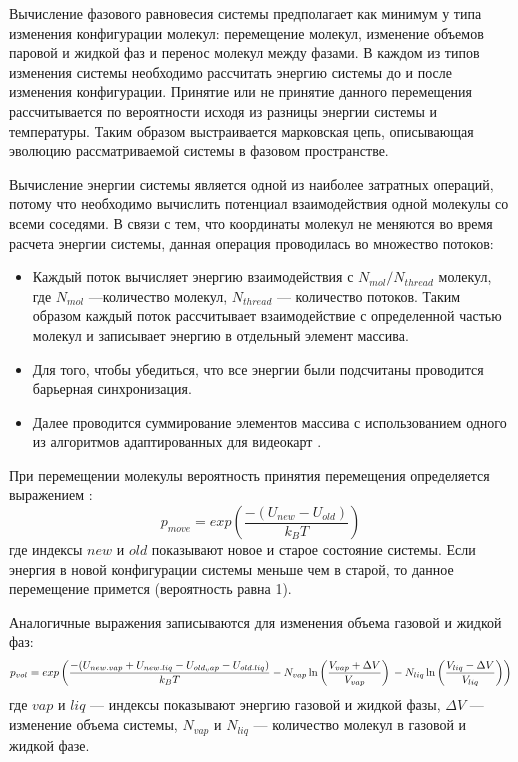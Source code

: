 Вычисление фазового равновесия системы предполагает как минимум у типа изменения конфигурации молекул: перемещение молекул, изменение объемов паровой и жидкой фаз и перенос молекул между фазами. В каждом из типов изменения системы необходимо рассчитать  энергию системы до и после изменения конфигурации. Принятие или не принятие данного перемещения рассчитывается по вероятности исходя из разницы энергии системы и температуры. Таким образом выстраивается марковская цепь, описывающая эволюцию рассматриваемой системы в фазовом пространстве. 

Вычисление энергии системы является одной из наиболее затратных операций, потому что необходимо вычислить потенциал взаимодействия одной молекулы со всеми соседями. В связи с тем, что координаты молекул не меняются во время расчета энергии системы, данная операция проводилась во множество потоков:
\begin{itemize}
	\item Каждый поток вычисляет энергию взаимодействия с $N_{mol}/N_{thread}$ молекул, где $N_{mol}$ ---количество молекул, $N_{thread}$ --- количество потоков. Таким образом каждый поток рассчитывает взаимодействие с определенной частью молекул и записывает энергию в отдельный элемент массива.
	\item Для того, чтобы убедиться, что все энергии были подсчитаны проводится барьерная синхронизация.
	\item Далее проводится суммирование элементов массива с использованием одного из алгоритмов адаптированных для видеокарт \cite{cudabook}.
\end{itemize}

При перемещении молекулы вероятность принятия перемещения определяется выражением \cite{Fernandes2015}:
\begin{equation}
	p_{move} = exp \left(\dfrac{-(U_{new} - U_{old})}{k_B T} \right)
\end{equation}
где индексы $new$ и $old$ показывают новое и старое состояние системы. Если энергия в новой конфигурации системы меньше чем в старой, то данное перемещение примется (вероятность равна 1).

Аналогичные выражения записываются для изменения объема газовой и жидкой фаз:
\begin{equation}
	p_{vol} =  exp \left(\dfrac{-(U_{new.vap} + U_{new.liq} - U_{old_vap} - U_{old.liq})}{k_B T} 
	- N_{vap} \ln \left( \dfrac{V_{vap} + \Delta V}{V_{vap}} \right) \\
	-  N_{liq} \ln \left( \dfrac{V_{liq} - \Delta V}{V_{liq}} \right) 
	\right) 
\end{equation}
где $vap$ и $liq$ --- индексы показывают энергию газовой и жидкой фазы, $\Delta V$ --- изменение объема системы, $N_{vap}$ и  $N_{liq}$ --- количество молекул в газовой и жидкой фазе.

